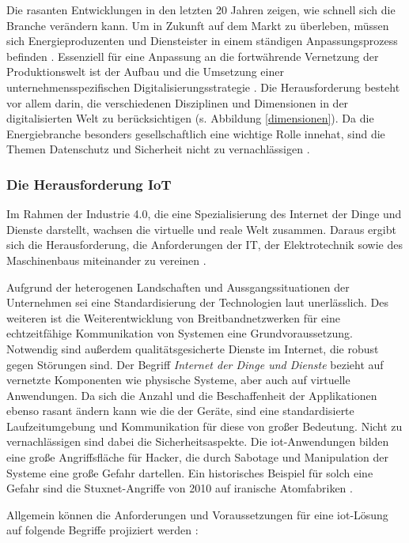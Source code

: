 \noindent Die rasanten Entwicklungen in den letzten 20 Jahren zeigen, wie schnell sich die Branche verändern kann. Um in Zukunft auf dem Markt zu überleben, müssen sich Energieproduzenten und Diensteister in einem ständigen Anpassungsprozess befinden \citep{Doleski2015}. Essenziell für eine Anpassung an die fortwährende Vernetzung der Produktionswelt ist der Aufbau und die Umsetzung einer unternehmensspezifischen Digitalisierungsstrategie \citep{Koester2017}. Die Herausforderung besteht vor allem darin, die verschiedenen Disziplinen und Dimensionen in der digitalisierten Welt zu berücksichtigen (s. Abbildung \ref{dimensionen}).  Da die Energiebranche besonders gesellschaftlich eine wichtige Rolle innehat, sind die Themen Datenschutz und Sicherheit nicht zu vernachlässigen \citep{Utecht2018}.


\subsubsection{Die Herausforderung IoT}\label{general}

Im Rahmen der Industrie 4.0, die eine Spezialisierung des Internet der Dinge und Dienste darstellt, wachsen die virtuelle und reale Welt zusammen. Daraus ergibt sich die Herausforderung, die Anforderungen der IT, der Elektrotechnik sowie des Maschinenbaus miteinander zu vereinen \citep{Huebner2017}.

\noindent Aufgrund der heterogenen Landschaften und Aussgangssituationen der Unternehmen sei eine Standardisierung der Technologien laut \citet{Bauer2014} unerlässlich. Des weiteren ist die Weiterentwicklung von Breitbandnetzwerken für eine echtzeitfähige Kommunikation von Systemen eine Grundvoraussetzung. Notwendig sind außerdem qualitätsgesicherte Dienste im Internet, die robust gegen Störungen sind. Der Begriff \textit{Internet der Dinge und Dienste} bezieht auf vernetzte Komponenten wie physische Systeme, aber auch auf virtuelle Anwendungen. Da sich die Anzahl und die Beschaffenheit der Applikationen ebenso rasant ändern kann wie die der Geräte, sind eine standardisierte Laufzeitumgebung und Kommunikation für diese von großer Bedeutung. Nicht zu vernachlässigen sind dabei die Sicherheitsaspekte. Die \ac{iot}-Anwendungen bilden eine große Angriffsfläche für Hacker, die durch Sabotage und Manipulation der Systeme eine große Gefahr dartellen. Ein historisches Beispiel für solch eine Gefahr sind die Stuxnet-Angriffe von 2010 auf iranische Atomfabriken \citep{Bauer2014}.

\noindent Allgemein können die Anforderungen und Voraussetzungen für eine \ac{iot}-Lösung auf folgende Begriffe projiziert werden \citep{Acharya2019}:

